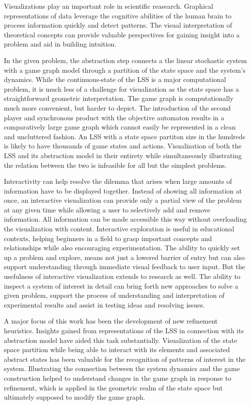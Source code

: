 Visualizations play an important role in scientific reasearch.
Graphical representations of data leverage the cognitive abilities of the human brain to process information quickly and detect patterns.
The visual interpretation of theoretical concepts can provide valuable perspectives for gaining insight into a problem and aid in building intuition.

In the given problem, the abstraction step connects a the linear stochastic system with a game graph model through a partition of the state space and the system's dynamics.
While the continuous-state of the LSS is a major computational problem, it is much less of a challenge for visualization as the state space has a straightforward geometric interpretation.
The game graph is computationally much more convenient, but harder to depict.
The introduction of the second player and synchronous product with the objective automaton results in a comparatively large game graph which cannot easily be represented in a clean and uncluttered fashion.
An LSS with a state space partiton size in the hundreds is likely to have thousands of game states and actions.
Visualization of both the LSS and its abstraction model in their entirety while simultaneously illustrating the relation between the two is infeasible for all but the simplest problems.

Interactivity can help resolve the dilemma that arises when large amounts of information have to be displayed together.
Instead of showing all information at once, an interactive visualization can provide only a partial view of the problem at any given time while allowing a user to selectively add and remove information.
All information can be made accessible this way without overloading the visualization with content.
Interactive exploration is useful in educational contexts, helping beginners in a field to grasp important concepts and relationships while also encouraging experimentation.
The ability to quickly set up a problem and explore, means not just a lowered barrier of entry but can also support understanding through immediate visual feedback to user input.
But the usefulness of interactive visualization extends to research as well.
The ability to inspect a system of interest in detail can bring forth new approaches to solve a given problem, support the process of understanding and interpretation of experimental results and assist in testing ideas and resolving issues.

A major focus of this work has been the development of new refinement heuristics.
Insights gained from representations of the LSS in connection with its abstraction model have aided this task substantially.
Visualization of the state space partition while being able to interact with its elements and associated abstract states has been valuable for the recognition of patterns of interest in the system.
Illustrating the connection between the system dynamics and the game construction helped to understand changes in the game graph in response to refinement, which is applied in the geometric realm of the state space but ultimately supposed to modify the game graph.

